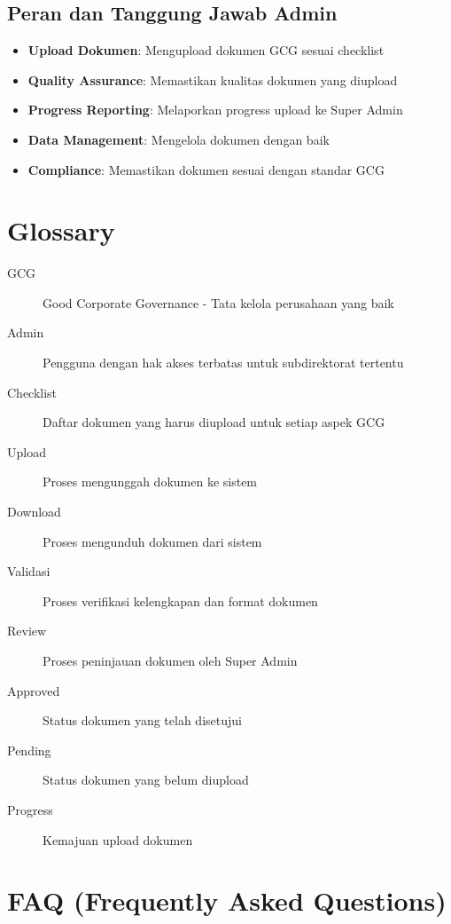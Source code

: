\documentclass[12pt,a4paper]{article}
\begin{document}
\subsection{Peran dan Tanggung Jawab Admin}
\begin{itemize}
\item \textbf{Upload Dokumen}: Mengupload dokumen GCG sesuai checklist
\item \textbf{Quality Assurance}: Memastikan kualitas dokumen yang diupload
\item \textbf{Progress Reporting}: Melaporkan progress upload ke Super Admin
\item \textbf{Data Management}: Mengelola dokumen dengan baik
\item \textbf{Compliance}: Memastikan dokumen sesuai dengan standar GCG
\end{itemize}

\appendix
\section{Glossary}
\begin{description}
\item[GCG] Good Corporate Governance - Tata kelola perusahaan yang baik
\item[Admin] Pengguna dengan hak akses terbatas untuk subdirektorat tertentu
\item[Checklist] Daftar dokumen yang harus diupload untuk setiap aspek GCG
\item[Upload] Proses mengunggah dokumen ke sistem
\item[Download] Proses mengunduh dokumen dari sistem
\item[Validasi] Proses verifikasi kelengkapan dan format dokumen
\item[Review] Proses peninjauan dokumen oleh Super Admin
\item[Approved] Status dokumen yang telah disetujui
\item[Pending] Status dokumen yang belum diupload
\item[Progress] Kemajuan upload dokumen
\end{description}

\section{FAQ (Frequently Asked Questions)}
\end{document}
